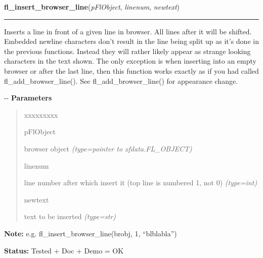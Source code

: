 \hspace{.8\funcindent}\begin{boxedminipage}{\funcwidth}

    \raggedright \textbf{fl\_insert\_browser\_line}(\textit{pFlObject}, \textit{linenum}, \textit{newtext})

    \vspace{-1.5ex}

    \rule{\textwidth}{0.5\fboxrule}
\setlength{\parskip}{2ex}

Inserts a line in front of a given line in browser. All lines after it
will be shifted. Embedded newline characters don't result in the line
being split up as it's done in the previous functions. Instead they will
rather likely appear as strange looking characters in the text shown. The
only exception is when inserting into an empty browser or after the last
line, then this function works exactly as if you had called
fl\_add\_browser\_line(). See fl\_add\_browser\_line() for appearance change.

-{}-
\setlength{\parskip}{1ex}
      \textbf{Parameters}
      \vspace{-1ex}

      \begin{quote}
        \begin{Ventry}{xxxxxxxxx}

          \item[pFlObject]


browser object
            {\it (type=pointer to xfdata.FL\_OBJECT)}

          \item[linenum]


line number after which insert it (top line is numbered 1, not 0)
            {\it (type=int)}

          \item[newtext]


text to be inserted
            {\it (type=str)}

        \end{Ventry}

      \end{quote}

\textbf{Note:} 
e.g. fl\_insert\_browser\_line(brobj, 1, ``blblabla'')


\textbf{Status:} 
Tested + Doc + Demo = OK


    \end{boxedminipage}

    \label{xformslib:flbrowser:fl_delete_browser_line}

